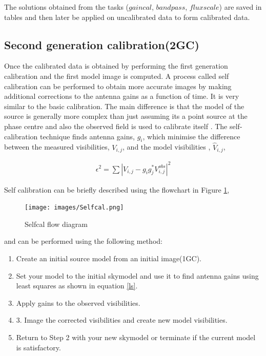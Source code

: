 The solutions obtained from the tasks ($\textit{gaincal}$, $\textit{bandpass}$, $\textit{fluxscale}$) are saved in tables and then later be applied on uncalibrated data 
to form calibrated data.

\subsection{Second generation calibration(2GC)}

Once the calibrated data is obtained by performing the first generation calibration and the first model image is computed. A process called self calibration can be performed to obtain more accurate images by making additional corrections to the antenna gains as a function of time. It is very similar to the basic calibration. The main difference is that the model of the source is generally more complex than just assuming its a point source at the phase centre and also the observed field is used to calibrate itself \citep{wieringa1992investigation}. The self-calibration technique finds antenna gains, $g_i$, which minimise the difference between the measured visibilities, $V_{i,j}$, and the model visibilities  \citep{grobler2016calibration}, $\hat{V}_{i,j}$, 

\begin{align}
\epsilon^2 = \sum |V_{i,j}-g_i g_j^* V^{obs}_{i,j}|^2
\label{ls}
\end{align}

Self calibration can be briefly described using the flowchart in Figure \ref{self},
\begin{figure}[H]
  \centering
    \texttt{[image: images/Selfcal.png]}
    \caption{Selfcal flow diagram} 
    \label{self} 
\end{figure}

and can be performed using the following method:
\begin{enumerate}
\item Create an initial source model from an initial image(1GC).
\item Set your model to the initial skymodel and use it to find antenna gains using least squares as shown in equation \ref{ls}.
\item Apply gains to the observed visibilities.
\item 3. Image the corrected visibilities and create new model visibilities. 
\item Return to Step 2 with your new skymodel or terminate if the current model is satisfactory.
\end{enumerate}
